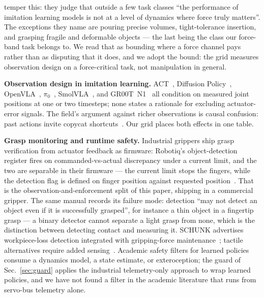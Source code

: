 \documentclass{article}
\begin{document}
\citet{xie2025forceful} temper this: they judge that outside a few task
classes ``the performance of imitation learning models is not at a level
of dynamics where force truly matters''. The exceptions they name are
pouring precise volumes, tight-tolerance insertion, and grasping fragile
and deformable objects --- the last being the class our force-band task
belongs to. We read that as bounding where a force channel pays rather
than as disputing that it does, and we adopt the bound: the grid measures
observation design on a force-critical task, not manipulation in
general.

\textbf{Observation design in imitation learning.}
ACT~\citep{zhao2023act}, Diffusion Policy~\citep{chi2023diffusion},
OpenVLA~\citep{kim2024openvla}, $\pi_0$~\citep{black2024pi0},
SmolVLA~\citep{shukor2025smolvla}, and GR00T~N1~\citep{nvidia2025groot}
all condition on measured joint positions at one or two timesteps; none
states a rationale for excluding actuator-error signals. The field's
argument against richer observations is causal confusion: past actions
invite copycat shortcuts~\citep{dehaan2019causal, wen2020copycat,
torne2025pasttoken}. Our grid places both effects in one table.

\textbf{Grasp monitoring and runtime safety.} Industrial grippers ship
grasp verification from actuator feedback as firmware: Robotiq's
object-detection register fires on commanded-vs-actual discrepancy under
a current limit, and the two are separable in their firmware --- the
current limit stops the fingers, while the detection flag is defined on
finger position against requested position~\citep{robotiq2019manual}.
That is the observation-and-enforcement split of this paper, shipping in
a commercial gripper. The same manual records its failure mode: detection
``may not detect an object even if it is successfully grasped'', for
instance a thin object in a fingertip grasp --- a binary detector cannot
separate a light grasp from none, which is the distinction between
detecting contact and measuring it. SCHUNK advertises workpiece-loss
detection integrated with gripping-force maintenance~\citep{schunk_egk};
tactile alternatives require added sensing~\citep{calandra2017feeling}.
Academic safety filters for learned policies~\citep{alshiekh2018shielding,
hsu2024safetyfilter, brunke2022safelearning} consume a dynamics model, a
state estimate, or exteroception; the guard of Sec.~\ref{sec:guard}
applies the industrial telemetry-only approach to wrap learned policies,
and we have not found a filter in the academic literature that runs from
servo-bus telemetry alone.
\end{document}
